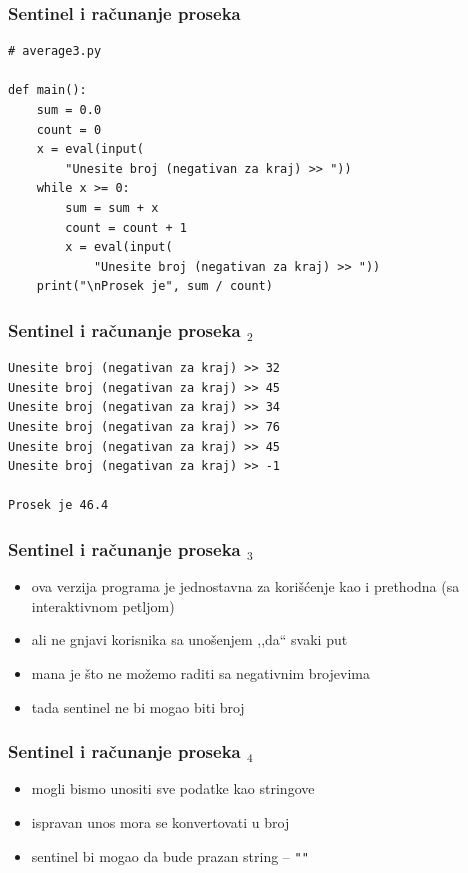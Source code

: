 \documentclass[utf8,compress]{beamer}
\begin{document}
\begin{frame}[fragile]
  \frametitle{Sentinel i računanje proseka}
\begin{verbatim}
# average3.py

def main():
    sum = 0.0
    count = 0
    x = eval(input(
        "Unesite broj (negativan za kraj) >> "))
    while x >= 0:
        sum = sum + x
        count = count + 1
        x = eval(input(
            "Unesite broj (negativan za kraj) >> "))
    print("\nProsek je", sum / count)
\end{verbatim}
\end{frame}

\begin{frame}[fragile]
  \frametitle{Sentinel i računanje proseka $_2$}
\begin{verbatim}
Unesite broj (negativan za kraj) >> 32
Unesite broj (negativan za kraj) >> 45
Unesite broj (negativan za kraj) >> 34
Unesite broj (negativan za kraj) >> 76
Unesite broj (negativan za kraj) >> 45
Unesite broj (negativan za kraj) >> -1

Prosek je 46.4
\end{verbatim}
\end{frame}

\begin{frame}[fragile]
  \frametitle{Sentinel i računanje proseka $_3$}
  \begin{itemize}
    \item ova verzija programa je jednostavna za korišćenje kao i prethodna (sa interaktivnom petljom)
    \item ali ne gnjavi korisnika sa unošenjem ,,da`` svaki put
    \item mana je što ne možemo raditi sa negativnim brojevima
    \item tada sentinel ne bi mogao biti broj
  \end{itemize}
\end{frame}

\begin{frame}[fragile]
  \frametitle{Sentinel i računanje proseka $_4$}
  \begin{itemize}
    \item mogli bismo unositi sve podatke kao stringove
    \item ispravan unos mora se konvertovati u broj
    \item sentinel bi mogao da bude prazan string -- \texttt{""}
  \end{itemize}
\end{frame}
\end{document}
